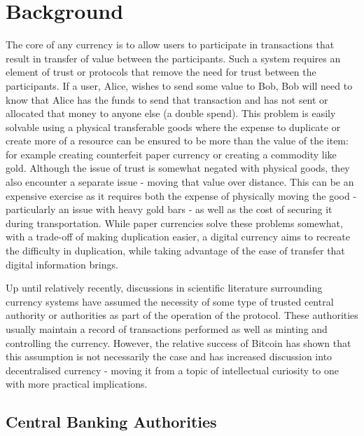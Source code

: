 \section{Background}
The core of any currency is to allow users to participate in transactions that result in transfer of value between the participants.  Such a system requires an element of trust or protocols that remove the need for trust between the participants.  If a user, Alice, wishes to send some value to Bob, Bob will need to know that Alice has the funds to send that transaction and has not sent or allocated that money to anyone else (a double spend). This problem is easily solvable using a physical transferable goods where the expense to duplicate or create more of a resource can be ensured to be more than the value of the item: for example creating counterfeit paper currency or creating a commodity like gold.  Although the issue of trust is somewhat negated with physical goods, they also encounter a separate issue - moving that value over distance.  This can be an expensive exercise as it requires both the expense of physically moving the good - particularly an issue with heavy gold bars - as well as the cost of securing it during transportation. While paper currencies solve these problems somewhat, with a trade-off of making duplication easier, a digital currency aims to recreate the difficulty in duplication, while taking advantage of the ease of transfer that digital information brings.

Up until relatively recently, discussions in scientific literature surrounding currency systems have assumed the necessity of some type of trusted central authority or authorities as part of the operation of the protocol.  These authorities usually maintain a record of transactions performed as well as minting and controlling the currency.  However, the relative success of Bitcoin has shown that this assumption is not necessarily the case and has increased discussion into decentralised currency - moving it from a topic of intellectual curiosity to one with more practical implications.

\subsection{Central Banking Authorities}


